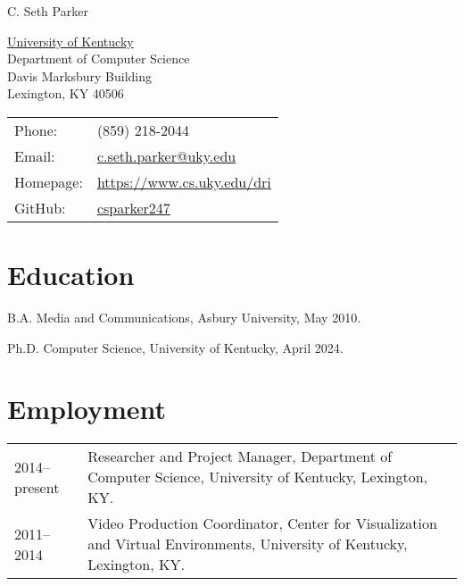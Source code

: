 \documentclass[letterpaper]{article}
\def\name{C. Seth Parker}
\renewenvironment{itemize}{
  \begin{list}{}{
    \setlength{\leftmargin}{1.5em}
  }
}{
  \end{list}
}
\begin{document}
{\huge \name}


\vspace{0.25in}

\begin{minipage}{0.45\linewidth}
  \href{http://www.uky.edu/}{University of Kentucky} \\
  Department of Computer Science \\
  Davis Marksbury Building \\
  Lexington, KY 40506
\end{minipage}
\begin{minipage}{0.45\linewidth}
  \begin{tabular}{ll}
    Phone: & (859) 218-2044 \\
    Email: & \href{mailto:c.seth.parker@uky.edu}{c.seth.parker@uky.edu} \\
    Homepage: & \href{https://www.cs.uky.edu/dri}{https://www.cs.uky.edu/dri} \\
    GitHub: & \href{https://www.github.com/csparker247}{csparker247} \\
  \end{tabular}
\end{minipage}


%


\section*{Education}

\begin{itemize}
  \item B.A. Media and Communications, Asbury University, May 2010.

  \item Ph.D. Computer Science, University of Kentucky, April 2024.
\end{itemize}


\section*{Employment}
\renewcommand{\arraystretch}{1.5}
\begin{tabularx}{\linewidth}{lX}
  2014--present & Researcher and Project Manager, Department of Computer Science, University of Kentucky, Lexington, KY. \\
  2011--2014 & Video Production Coordinator, Center for Visualization and Virtual Environments, University of Kentucky, Lexington, KY. \\
\end{tabularx}
\end{document}
